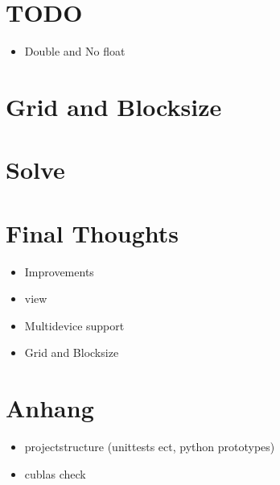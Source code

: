 \section{TODO}
\begin{itemize}
	\item Double and No float
\end{itemize}

\section{Grid and Blocksize}
\section{Solve}
\section{Final Thoughts}
\begin{itemize}
	\item Improvements
	\item view
	\item Multidevice support
	\item Grid and Blocksize
\end{itemize}

\section{Anhang}
\begin{itemize}
	\item projectstructure (unittests ect, python prototypes)
	\item cublas check
\end{itemize}